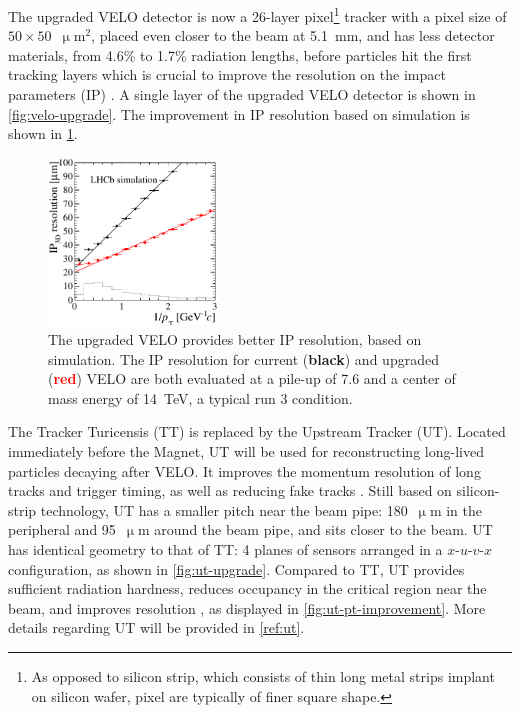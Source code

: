 The upgraded VELO detector is now a 26-layer pixel\footnote{
    As opposed to silicon strip, which consists of thin long metal strips
    implant on silicon wafer,
    pixel are typically of finer square shape.
} tracker with a pixel size of $50 \times 50$~$\upmu$m$^2$,
placed even closer to the beam at 5.1~mm,
and has less detector materials, from 4.6\% to 1.7\% radiation lengths, before
particles hit the first tracking layers which is crucial to improve the
resolution on the impact parameters (IP) \cite{Hennessy_2017}.
A single layer of the upgraded VELO detector is shown in
\cref{fig:velo-upgrade}.
The improvement in IP resolution based on simulation is shown in
\cref{fig:velo-ip-improvement}.

\begin{figure}[!htb]
    \centering
    \includegraphics[width=0.4\textwidth]{./figs-lhcb-upgrade-overview/tracking/velo_ip_improvement.pdf}
    \caption{
        The upgraded VELO provides better IP resolution, based on simulation.
        The IP resolution for current (\textbf{black}) and upgraded
        (\textcolor{red}{\textbf{red}})
        VELO are both evaluated at a
        pile-up of 7.6 and a center of mass energy of 14~TeV, a typical run 3
        condition.
    }
    \label{fig:velo-ip-improvement}
\end{figure}

The Tracker Turicensis (TT) is replaced by the Upstream Tracker (UT).
Located immediately before the Magnet,
UT will be used for reconstructing long-lived particles decaying after VELO.
It improves the momentum resolution of long tracks and trigger timing,
as well as reducing fake tracks
\cite{Piucci_2017,Wang:2015mem}.
Still based on silicon-strip technology, UT has a smaller pitch near the beam
pipe:
180~$\upmu$m in the peripheral and 95~$\upmu$m around the beam pipe,
and sits closer to the beam.
UT has identical geometry to that of TT:
4 planes of sensors arranged in a $x$-$u$-$v$-$x$ configuration,
as shown in \cref{fig:ut-upgrade}.
Compared to TT, UT provides sufficient radiation hardness,
reduces occupancy in the critical region near the beam, and improves
\pt resolution \cite{LHCB-TDR-015},
as displayed in \cref{fig:ut-pt-improvement}.
More details regarding UT will be provided in \cref{ref:ut}.

